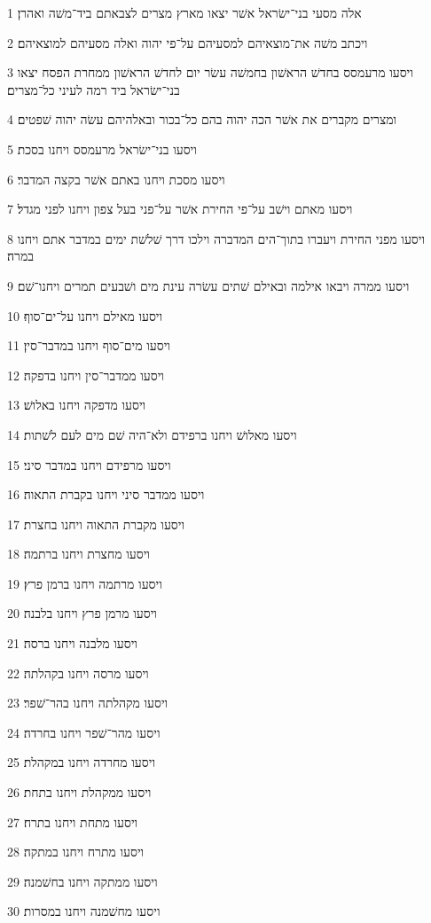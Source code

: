\par 1 אלה מסעי בני־ישׂראל אשׁר יצאו מארץ מצרים לצבאתם ביד־משׁה ואהרן׃
\par 2 ויכתב משׁה את־מוצאיהם למסעיהם על־פי יהוה ואלה מסעיהם למוצאיהם׃
\par 3 ויסעו מרעמסס בחדשׁ הראשׁון בחמשׁה עשׂר יום לחדשׁ הראשׁון ממחרת הפסח יצאו בני־ישׂראל ביד רמה לעיני כל־מצרים׃
\par 4 ומצרים מקברים את אשׁר הכה יהוה בהם כל־בכור ובאלהיהם עשׂה יהוה שׁפטים׃
\par 5 ויסעו בני־ישׂראל מרעמסס ויחנו בסכת׃
\par 6 ויסעו מסכת ויחנו באתם אשׁר בקצה המדבר׃
\par 7 ויסעו מאתם וישׁב על־פי החירת אשׁר על־פני בעל צפון ויחנו לפני מגדל׃
\par 8 ויסעו מפני החירת ויעברו בתוך־הים המדברה וילכו דרך שׁלשׁת ימים במדבר אתם ויחנו במרה׃
\par 9 ויסעו ממרה ויבאו אילמה ובאילם שׁתים עשׂרה עינת מים ושׁבעים תמרים ויחנו־שׁם׃
\par 10 ויסעו מאילם ויחנו על־ים־סוף׃
\par 11 ויסעו מים־סוף ויחנו במדבר־סין׃
\par 12 ויסעו ממדבר־סין ויחנו בדפקה׃
\par 13 ויסעו מדפקה ויחנו באלושׁ׃
\par 14 ויסעו מאלושׁ ויחנו ברפידם ולא־היה שׁם מים לעם לשׁתות׃
\par 15 ויסעו מרפידם ויחנו במדבר סיני׃
\par 16 ויסעו ממדבר סיני ויחנו בקברת התאוה׃
\par 17 ויסעו מקברת התאוה ויחנו בחצרת׃
\par 18 ויסעו מחצרת ויחנו ברתמה׃
\par 19 ויסעו מרתמה ויחנו ברמן פרץ׃
\par 20 ויסעו מרמן פרץ ויחנו בלבנה׃
\par 21 ויסעו מלבנה ויחנו ברסה׃
\par 22 ויסעו מרסה ויחנו בקהלתה׃
\par 23 ויסעו מקהלתה ויחנו בהר־שׁפר׃
\par 24 ויסעו מהר־שׁפר ויחנו בחרדה׃
\par 25 ויסעו מחרדה ויחנו במקהלת׃
\par 26 ויסעו ממקהלת ויחנו בתחת׃
\par 27 ויסעו מתחת ויחנו בתרח׃
\par 28 ויסעו מתרח ויחנו במתקה׃
\par 29 ויסעו ממתקה ויחנו בחשׁמנה׃
\par 30 ויסעו מחשׁמנה ויחנו במסרות׃
